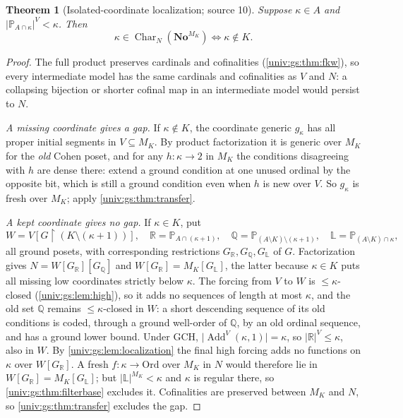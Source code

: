 \documentclass[11pt,letterpaper]{article}
\numberwithin{equation}{section}
\newtheorem{theorem}{Theorem}[section]
\theoremstyle{definition}
\theoremstyle{remark}
\newcommand{\No}{\mathbf{No}}
\newcommand{\Ord}{\mathrm{Ord}}
\newcommand{\Add}{\operatorname{Add}}
\newcommand{\res}{\mathbin{\upharpoonright}}
\newcommand{\abs}[1]{\lvert#1\rvert}
\newcommand{\Char}{\operatorname{Char}}
\begin{document}
\begin{theorem}[Isolated-coordinate localization; source 10]\label{univ:gs:thm:isolated}
Suppose $\kappa\in A$ and $\abs{\mathbb P_{A\cap\kappa}}^V<\kappa$. Then
\[
 \kappa\in\Char_N(\No^{M_K})\iff\kappa\notin K.
\]
\end{theorem}
\begin{proof}
The full product preserves cardinals and cofinalities (\cref{univ:gs:thm:fkw}), so
every intermediate model has the same cardinals and cofinalities as $V$ and $N$: a
collapsing bijection or shorter cofinal map in an intermediate model would persist to
$N$.

\emph{A missing coordinate gives a gap.} If $\kappa\notin K$, the coordinate generic
$g_\kappa$ has all proper initial segments in $V\subseteq M_K$. By product factorization
it is generic over $M_K$ for the \emph{old} Cohen poset, and for any $h:\kappa\to2$ in
$M_K$ the conditions disagreeing with $h$ are dense there: extend a ground condition at
one unused ordinal by the opposite bit, which is still a ground condition even when $h$
is new over $V$. So $g_\kappa$ is fresh over $M_K$; apply \cref{univ:gs:thm:transfer}.

\emph{A kept coordinate gives no gap.} If $\kappa\in K$, put
\[
 W=V[G\res(K\setminus(\kappa+1))],\quad
 \mathbb R=\mathbb P_{A\cap(\kappa+1)},\quad
 \mathbb Q=\mathbb P_{(A\setminus K)\setminus(\kappa+1)},\quad
 \mathbb L=\mathbb P_{(A\setminus K)\cap\kappa},
\]
all ground posets, with corresponding restrictions $G_{\mathbb R},G_{\mathbb Q},G_{\mathbb L}$ of
$G$. Factorization gives $N=W[G_{\mathbb R}][G_{\mathbb Q}]$ and $W[G_{\mathbb R}]=M_K[G_{\mathbb L}]$,
the latter because $\kappa\in K$ puts all missing low coordinates strictly below
$\kappa$. The forcing from $V$ to $W$ is $\le\kappa$-closed (\cref{univ:gs:lem:high}),
so it adds no sequences of length at most $\kappa$, and the old set $\mathbb Q$ remains
$\le\kappa$-closed in $W$: a short descending sequence of its old conditions is coded,
through a ground well-order of $\mathbb Q$, by an old ordinal sequence, and has a ground
lower bound. Under GCH, $\abs{\Add^V(\kappa,1)}=\kappa$, so $\abs{\mathbb R}^V\le\kappa$, also
in $W$. By \cref{univ:gs:lem:localization} the final high forcing adds no functions on
$\kappa$ over $W[G_{\mathbb R}]$. A fresh $f:\kappa\to\Ord$ over $M_K$ in $N$ would therefore
lie in $W[G_{\mathbb R}]=M_K[G_{\mathbb L}]$; but $\abs{\mathbb L}^{M_K}<\kappa$ and $\kappa$ is
regular there, so \cref{univ:gs:thm:filterbase} excludes it. Cofinalities are preserved
between $M_K$ and $N$, so \cref{univ:gs:thm:transfer} excludes the gap.
\end{proof}
\end{document}
